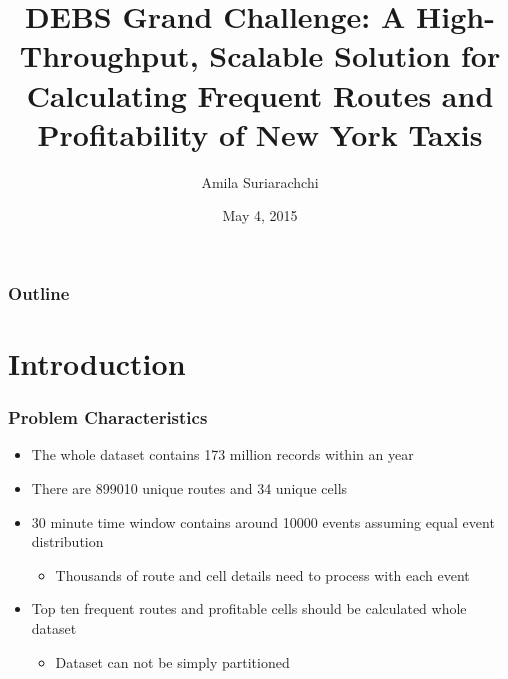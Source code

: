 \documentclass{beamer}
\title[Grand Challenge 2015]{DEBS Grand Challenge: A High-Throughput, Scalable Solution for Calculating Frequent Routes and Profitability of New York Taxis} %
\author{Amila Suriarachchi} %
\institute[CSU] %
{
Colorado State University \\ %
\medskip
\textit{amilas@cs.colostate.edu} %
\medskip
}
\date{May 4, 2015} %
\begin{document}
\begin{frame}
\titlepage %
\end{frame}

\begin{frame}
\frametitle{Outline} %
\tableofcontents %
\end{frame}


\section{Introduction} %

\begin{frame}
\frametitle{Problem Characteristics}
\begin{itemize}
	\item The whole dataset contains 173 million records within an year
	\item There are 899010 unique routes and 34 unique cells
	\item 30 minute time window contains around 10000 events assuming equal event distribution
		\begin{itemize}
			\item Thousands of route and cell details need to process with each event
		\end{itemize}
	\item Top ten frequent routes and profitable cells should be calculated whole dataset
		\begin{itemize}
                        \item Dataset can not be simply partitioned 
                \end{itemize}
\end{itemize}

\end{frame}
\end{document}
